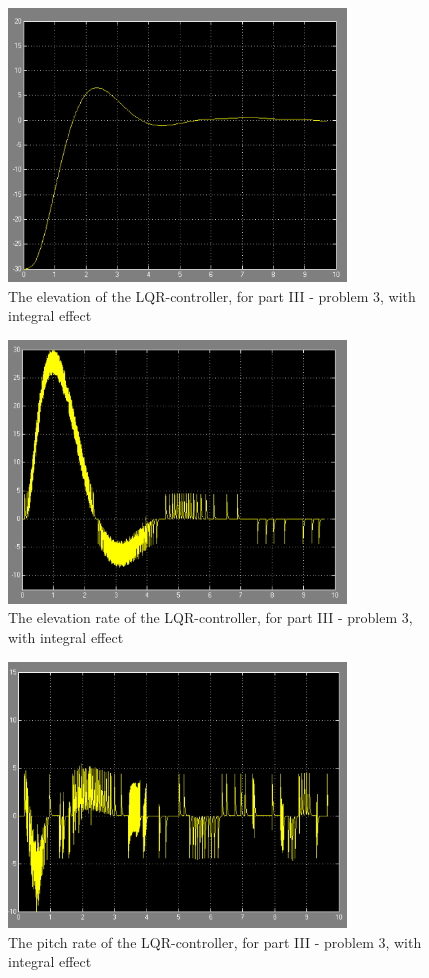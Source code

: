 \begin{figure}[H]
    \centering
    \includegraphics[width=0.8\textwidth]{figures/P3p3_elevation}
    \caption{The elevation of the LQR-controller, for part III - problem 3, with integral effect}
    \label{fig:P3p3_elevation}
\end{figure}

\begin{figure}[H]
    \centering
    \includegraphics[width=0.8\textwidth]{figures/P3p3_elevationrate}
    \caption{The elevation rate of the LQR-controller, for part III - problem 3, with integral effect}
    \label{fig:P3p3_elevationrate}
\end{figure}

\begin{figure}[H]
    \centering
    \includegraphics[width=0.8\textwidth]{figures/P3p3_pitchrate}
    \caption{The pitch rate of the LQR-controller, for part III - problem 3, with integral effect}
    \label{fig:P3p3_pitchrate}
\end{figure}
